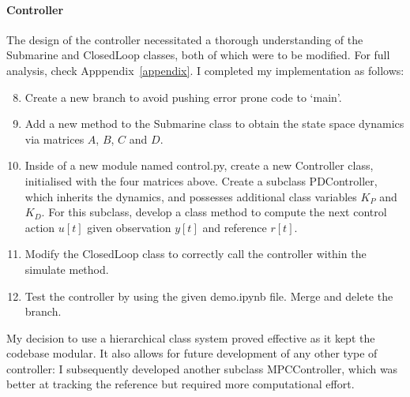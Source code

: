 \documentclass[hidelinks]{article}
\begin{document}
\paragraph{Controller}
The design of the controller necessitated a thorough understanding of the Submarine and ClosedLoop classes, both of which were to be modified.
For full analysis, check Apppendix~\ref{appendix}. I completed my implementation as follows:
%
\begin{enumerate}
    \setcounter{enumi}{7}
    \item Create a new branch to avoid pushing error prone code to `main'.
    \item Add a new method to the Submarine class to obtain the state space dynamics via matrices $A$, $B$, $C$ and $D$.
    \item Inside of a new module named control.py, create a new Controller class, initialised with the four matrices above. Create a subclass PDController, which inherits the dynamics, and possesses additional class variables $K_P$ and $K_D$. For this subclass, develop a class method to compute the next control action $u[t]$ given observation $y[t]$ and reference $r[t]$.
    \item Modify the ClosedLoop class to correctly call the controller within the simulate method.
    \item Test the controller by using the given demo.ipynb file. Merge and delete the branch.
\end{enumerate}
My decision to use a hierarchical class system proved effective as it kept the codebase modular. It also allows for future development of any other type of controller: I subsequently developed another subclass MPCController, which was better at tracking the reference but required more computational effort.
%
\newpage
\appendix
\end{document}
